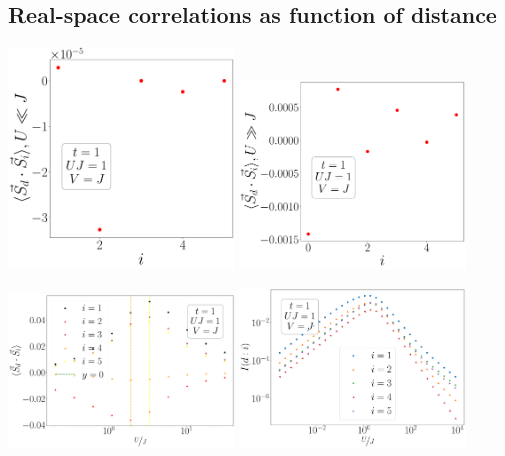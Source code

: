 \documentclass{report}
\numberwithin{equation}{section}
\begin{document}
\subsection*{Real-space correlations as function of distance}
\begin{center}
	\includegraphics[width=0.45\textwidth]{../figures/corr-di-min-t=1.000,J=1_over_U,V=J,N=6,U=0.016,91.116,32.pdf}
	\includegraphics[width=0.45\textwidth]{../figures/corr-di-max-t=1.000,J=1_over_U,V=J,N=6,U=0.016,91.116,32.pdf}

	\includegraphics[width=0.45\textwidth]{../figures/corr-all-t=1.000,J=1_over_U,V=J,N=6,U=0.016,91.116,32.pdf}
	\includegraphics[width=0.45\textwidth]{../figures/I-all-t=1.000,J=1_over_U,V=J,N=6,U=0.016,91.116,32.pdf}
\end{center}
\end{document}
